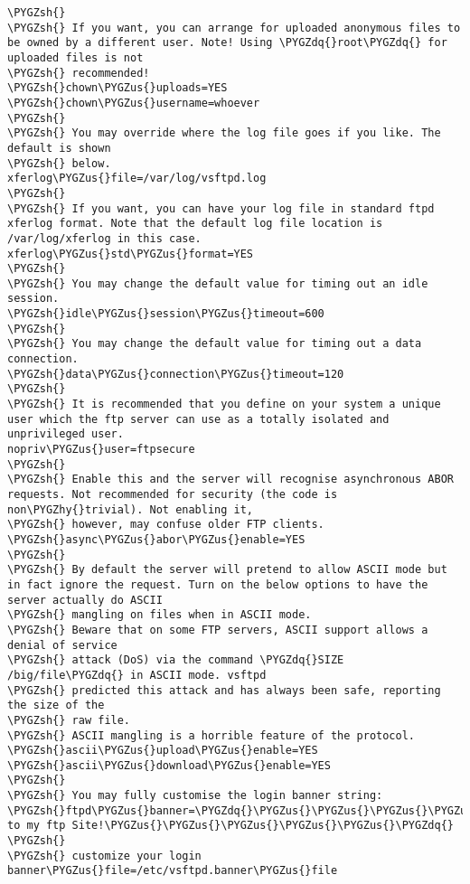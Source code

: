 \documentclass[letterpaper,10pt,english]{sphinxmanual}
\def\PYGZus{\char`\_}
\def\PYGZsh{\char`\#}
\def\PYGZhy{\char`\-}
\def\PYGZdq{\char`\"}
\begin{document}
\begin{Verbatim}[commandchars=\\\{\}]
\PYGZsh{}
\PYGZsh{} If you want, you can arrange for uploaded anonymous files to be owned by a different user. Note! Using \PYGZdq{}root\PYGZdq{} for uploaded files is not
\PYGZsh{} recommended!
\PYGZsh{}chown\PYGZus{}uploads=YES
\PYGZsh{}chown\PYGZus{}username=whoever
\PYGZsh{}
\PYGZsh{} You may override where the log file goes if you like. The default is shown
\PYGZsh{} below.
xferlog\PYGZus{}file=/var/log/vsftpd.log
\PYGZsh{}
\PYGZsh{} If you want, you can have your log file in standard ftpd xferlog format. Note that the default log file location is /var/log/xferlog in this case.
xferlog\PYGZus{}std\PYGZus{}format=YES
\PYGZsh{}
\PYGZsh{} You may change the default value for timing out an idle session.
\PYGZsh{}idle\PYGZus{}session\PYGZus{}timeout=600
\PYGZsh{}
\PYGZsh{} You may change the default value for timing out a data connection.
\PYGZsh{}data\PYGZus{}connection\PYGZus{}timeout=120
\PYGZsh{}
\PYGZsh{} It is recommended that you define on your system a unique user which the ftp server can use as a totally isolated and unprivileged user.
nopriv\PYGZus{}user=ftpsecure
\PYGZsh{}
\PYGZsh{} Enable this and the server will recognise asynchronous ABOR requests. Not recommended for security (the code is non\PYGZhy{}trivial). Not enabling it,
\PYGZsh{} however, may confuse older FTP clients.
\PYGZsh{}async\PYGZus{}abor\PYGZus{}enable=YES
\PYGZsh{}
\PYGZsh{} By default the server will pretend to allow ASCII mode but in fact ignore the request. Turn on the below options to have the server actually do ASCII
\PYGZsh{} mangling on files when in ASCII mode.
\PYGZsh{} Beware that on some FTP servers, ASCII support allows a denial of service
\PYGZsh{} attack (DoS) via the command \PYGZdq{}SIZE /big/file\PYGZdq{} in ASCII mode. vsftpd
\PYGZsh{} predicted this attack and has always been safe, reporting the size of the
\PYGZsh{} raw file.
\PYGZsh{} ASCII mangling is a horrible feature of the protocol.
\PYGZsh{}ascii\PYGZus{}upload\PYGZus{}enable=YES
\PYGZsh{}ascii\PYGZus{}download\PYGZus{}enable=YES
\PYGZsh{}
\PYGZsh{} You may fully customise the login banner string:
\PYGZsh{}ftpd\PYGZus{}banner=\PYGZdq{}\PYGZus{}\PYGZus{}\PYGZus{}\PYGZus{}\PYGZus{}\PYGZus{}\PYGZus{}\PYGZus{}\PYGZus{}\PYGZus{}\PYGZus{}\PYGZus{}\PYGZus{}\PYGZus{}\PYGZus{}\PYGZus{}\PYGZus{}\PYGZus{}\PYGZus{}\PYGZus{}\PYGZus{}\PYGZus{}\PYGZus{}\PYGZus{}\PYGZus{}\PYGZus{}\PYGZus{}\PYGZus{}\PYGZus{}\PYGZus{}\PYGZus{}\PYGZus{}\PYGZus{}\PYGZus{}\PYGZus{}\PYGZus{}\PYGZus{}Welcome to my ftp Site!\PYGZus{}\PYGZus{}\PYGZus{}\PYGZus{}\PYGZus{}\PYGZdq{}
\PYGZsh{}
\PYGZsh{} customize your login
banner\PYGZus{}file=/etc/vsftpd.banner\PYGZus{}file

\end{Verbatim}
\end{document}
